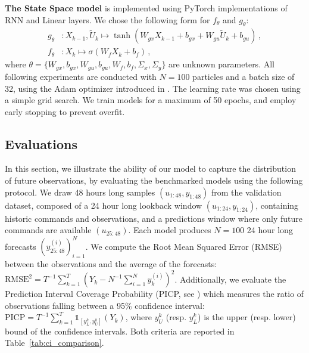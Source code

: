 \documentclass[conference]{IEEEtran}
\begin{document}
\textbf{The State Space model} is implemented using PyTorch implementations of  RNN and Linear layers.
We chose the following form for $f_\theta$ and $g_\theta$:
\begin{align*}
	g_\theta & : X_{k-1}, \widetilde U_k \mapsto \tanh(W_{gx} X_{k-1} + b_{gx} + W_{gu} \widetilde U_k + b_{gu})\,, \\
	f_\theta & : X_k \mapsto  \sigma(W_f X_k + b_f)\,,
\end{align*}
where $\theta = \{W_{gx}, b_{gx}, W_{gu}, b_{gu}, W_f, b_f,\Sigma_x,\Sigma_y\}$ are unknown parameters.
All following experiments are conducted with $N=100$ particles and a batch size of 32, using the Adam optimizer introduced in \cite{Kingma2015AdamAM}.
The learning rate was chosen using a simple grid search.
We train models for a maximum of 50 epochs, and employ early stopping to prevent overfit.

\subsection{Evaluations}%
\label{sub:evaluations}

In this section, we illustrate the ability of our model to capture the distribution of future observations, by evaluating the benchmarked models using the following protocol. We draw 48 hours long samples $(u_{1:48}, y_{1:48})$ from the validation dataset, composed of a 24 hour long lookback window $(u_{1:24}, y_{1:24})$, containing historic commands and observations, and a predictions window where only future commands are available $(u_{25:48})$.
Each model produces $N=100$ 24 hour long forecasts $(y_{25:48}^{(i)})_{i=1}^N$.
We compute the Root Mean Squared Error (RMSE) between the observations and the average of the forecasts: $\mathrm{RMSE}^2 = T^{-1} \sum_{k=1}^T (Y_k - N^{-1} \sum_{i=1}^N y_k^{(i)})^2$.
Additionally, we evaluate the Prediction Interval Coverage Probability (PICP, see \cite{Durga2006PICP}) which measures the ratio of observations falling between a 95\% confidence interval: $\mathrm{PICP} = T^{-1} \sum^{T}_{k=1} \mathbb{1}_{[y_L^k, y_U^k]}(Y_k)$, where $y_U^k$ (resp. $y_L^k$) is the upper (resp. lower) bound of the confidence intervals.
Both criteria are reported in Table~\ref{tab:ci_comparison}.
\end{document}
